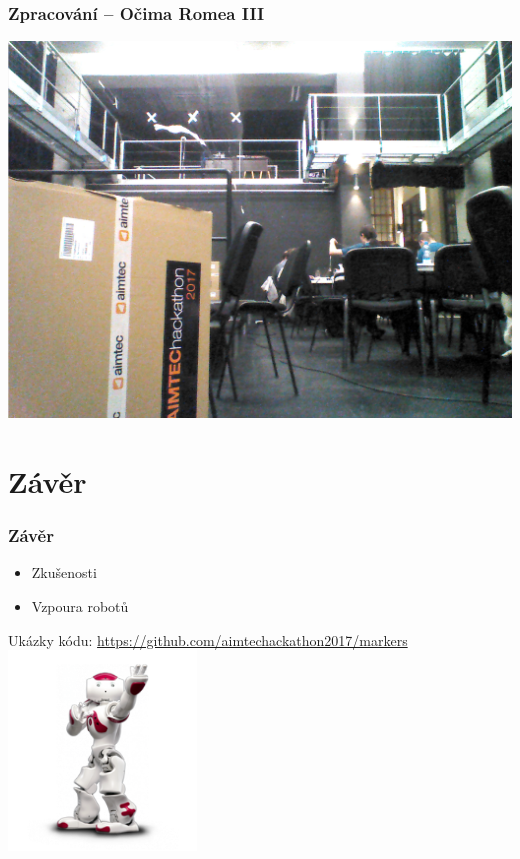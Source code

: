 \documentclass{beamer}
\begin{document}
\begin{frame}
\frametitle{Zpracování -- Očima Romea III}  
	\includegraphics[width=\textwidth]{img/nao_jeho_pohled3.png}	 
\end{frame}


\section{Závěr}
\begin{frame}
\frametitle{Závěr} 
	\begin{itemize}
		\item{Zkušenosti}
		\item{Vzpoura robotů}
	\end{itemize}
	Ukázky kódu:
	\small{\url{https://github.com/aimtechackathon2017/markers}}
\includegraphics[width=5cm]{img/nao_ukazuje.png}	


\end{frame}
\end{document}
